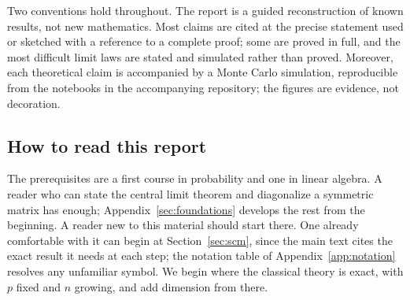 Two conventions hold throughout. The report is a guided reconstruction of known results, not new mathematics. Most claims are cited at the precise statement used or sketched with a reference to a complete proof; some are proved in full, and the most difficult limit laws are stated and simulated rather than proved. Moreover, each theoretical claim is accompanied by a Monte Carlo simulation, reproducible from the notebooks in the accompanying repository; the figures are evidence, not decoration.

\subsection*{How to read this report}

The prerequisites are a first course in probability and one in linear algebra. A reader who can state the central limit theorem and diagonalize a symmetric matrix has enough; Appendix~\ref{sec:foundations} develops the rest from the beginning. A reader new to this material should start there. One already comfortable with it can begin at Section~\ref{sec:scm}, since the main text cites the exact result it needs at each step; the notation table of Appendix~\ref{app:notation} resolves any unfamiliar symbol. We begin where the classical theory is exact, with \(p\) fixed and \(n\) growing, and add dimension from there.

\clearpage
